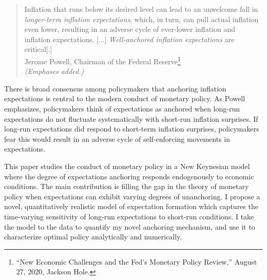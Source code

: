 \documentclass[11pt]{article}
\renewcommand{\[}{\begin{equation}}
\renewcommand{\]}{\end{equation}}
\begin{document}
\begin{quote}
Inflation that runs below its desired level can lead to an unwelcome fall in \emph{longer-term inflation expectations}, which, in turn, can pull actual inflation even lower, resulting in an adverse cycle of ever-lower inflation and inflation expectations.
[...]  \emph{Well-anchored inflation expectations} are critical[.]  \\
Jerome Powell, Chairman of the Federal Reserve\footnote{``New Economic Challenges and the Fed's Monetary Policy Review,''  August 27, 2020, Jackson Hole.} \\
\emph{(Emphases added.)}
\end{quote}	


There is broad consensus among policymakers that anchoring inflation expectations is central to the modern conduct of monetary policy. As Powell emphasizes, policymakers think of expectations as anchored when long-run expectations do not fluctuate systematically with short-run inflation surprises. If long-run expectations did respond to short-term inflation surprises, policymakers fear this would result in an adverse cycle of self-enforcing movements in expectations.

This paper studies the conduct of monetary policy in a New Keynesian model where the degree of expectations anchoring responds endogenously to economic conditions. The main contribution is filling the gap in the theory of monetary policy when expectations can exhibit varying degrees of unanchoring. I propose a novel, quantitatively realistic model of expectation formation which captures the time-varying sensitivity of long-run expectations to short-run conditions. I take the model to the data to quantify my novel anchoring mechanism, and use it to characterize optimal policy analytically and numerically.
\end{document}
